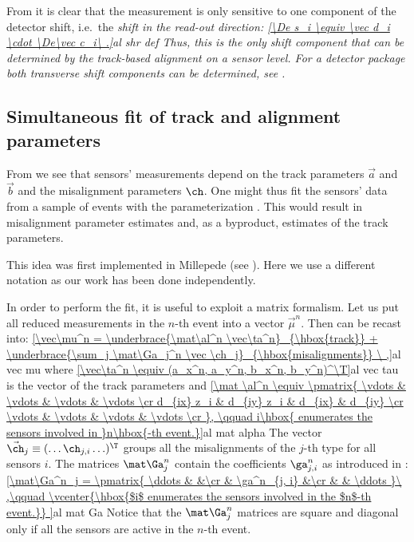 
From  it is clear that the measurement is only sensitive to one component of the detector shift, i.e.~the \em{shift in the read-out direction}:
\eqref{\De s_i \equiv \vec d_i \cdot \De\vec c_i\ .}{al shr def}
Thus, this is the only shift component that can be determined by the track-based alignment on a sensor level. For a detector package both transverse shift components can be determined, see .


\subsection[al sim fit]{Simultaneous fit of track and alignment parameters}

From  we see that sensors' measurements depend on the track parameters $\vec a$ and $\vec b$ and the misalignment parameters $\ch$. One might thus fit the sensors' data from a sample of events with the parameterization . This would result in misalignment parameter estimates and, as a byproduct, estimates of the track parameters.

This idea was first implemented in Millepede (see ). Here we use a different notation as our work has been done independently.

In order to perform the fit, it is useful to exploit a matrix formalism. Let us put all reduced measurements in the $n$-th event into a vector $\vec\mu^n$. Then  can be recast into:
\eqref{\vec\mu^n =
	\underbrace{\mat\al^n \vec\ta^n}_{\hbox{track}}
	+
	\underbrace{\sum_j \mat\Ga_j^n \vec \ch_j}_{\hbox{misalignments}}
\ ,}{al vec mu}
where
\eqref{\vec\ta^n \equiv (a_x^n, a_y^n, b_x^n, b_y^n)^\T}{al vec tau}
is the vector of the track parameters and 
\eqref{\mat \al^n \equiv \pmatrix{
	\vdots		& \vdots		& \vdots	& \vdots \cr
	d_{ix} z_i	& d_{iy} z_i	& d_{ix}	& d_{iy} \cr
	\vdots		& \vdots		& \vdots	& \vdots \cr
}, \qquad i\hbox{ enumerates the sensors involved in }n\hbox{-th event.}}{al mat alpha}
The vector $\vec\ch_j \equiv (\ldots \ch_{j,i}\ldots)^\T$ groups all the misalignments of the $j$-th type for all sensors $i$. The matrices $\mat\Ga_j^n$ contain the coefficients $\ga^n_{j,i}$ as introduced in :
\eqref{\mat\Ga^n_j = \pmatrix{
		\ddots	&				&\cr
				& \ga^n_{j, i}	&\cr
				&				& \ddots
	}\ ,\qquad
	\vcenter{\hbox{$i$ enumerates the sensors involved in the $n$-th event.}}
}{al mat Ga}
Notice that the $\mat\Ga^n_j$ matrices are square and diagonal only if all the sensors are active in the $n$-th event.

